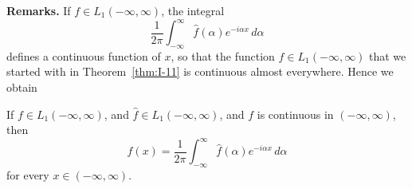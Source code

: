 \noindent\textbf{Remarks.}
If $f\in L_1(-\infty,\infty)$, the integral
\begin{equation*}
\frac{1}{2\pi}\int_{-\infty}^{\infty}\widehat f(\alpha)e^{-i\alpha x}\,d\alpha
\end{equation*}
defines a continuous function of $x$, so that the function $f\in L_1(-\infty,\infty)$ that we started with in Theorem~\ref{thm:I-11} is continuous almost everywhere. Hence we obtain

\begin{theorem}\label{thm:I-11p}
If $f\in L_1(-\infty,\infty)$, and $\widehat f\in L_1(-\infty,\infty)$, and $f$ is continuous in $(-\infty,\infty)$, then
\begin{equation*}
f(x)=\frac{1}{2\pi}\int_{-\infty}^{\infty}\widehat f(\alpha)e^{-i\alpha x}\,d\alpha
\end{equation*}
for every $x\in(-\infty,\infty)$.
\end{theorem}

